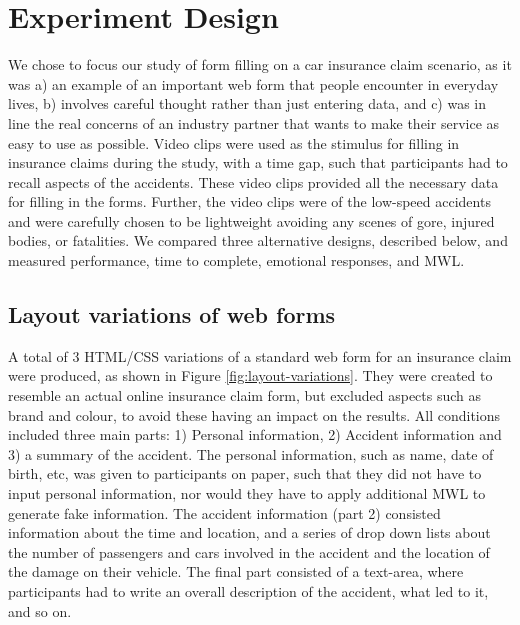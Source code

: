 \documentclass[../main/Feedback.tex]{subfiles}
\begin{document}
\section{Experiment Design}
We chose to focus our study of form filling on a car insurance claim scenario, as it was a) an example of an important web form that people encounter in everyday lives, b) involves careful thought rather than just entering data, and c) was in line the real concerns of an industry partner that wants to make their service as easy to use as possible. Video clips were used as the stimulus for filling in insurance claims during the study,  with a time gap, such that participants had to recall aspects of the accidents. These video clips provided all the necessary data for filling in the forms.
Further, the video clips were of the low-speed accidents and were carefully chosen to be lightweight avoiding any scenes of gore, injured bodies, or fatalities. We compared three alternative designs, described below, and measured performance, time to complete, emotional responses, and MWL.

\subsection{Layout variations of web forms}
A total of 3 HTML/CSS variations of a standard web form for an insurance claim were produced, as shown in Figure \ref{fig:layout-variations}.
They were created to resemble an actual online insurance claim form, but excluded aspects such as brand and colour, to avoid these having an impact on the results.
All conditions included three main parts: 1) Personal information, 2) Accident information and 3) a summary of the accident.
The personal information, such as name, date of birth, etc, was given to participants on paper, such that they did not have to input personal information, nor would they have to apply additional MWL to generate fake information.
The accident information (part 2) consisted information about the time and location, and a series of drop down lists about the number of passengers and cars involved in the accident and the location of the damage on their vehicle.
The final part consisted of a text-area, where participants had to write an overall description of the accident, what led to it, and so on. 
\end{document}
